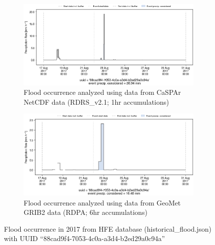 \documentclass[10pt,a4paper,titlepage,parskip]{scrartcl}
\begin{document}
\begin{figure}[h]
	\begin{subfigure}[a]{1.0\textwidth}
		\centering
		\includegraphics[width=\linewidth]{figures/compare_Geomet_CaSPAr/interpolated_at_stations_occurrence_1008_identified-timesteps_RDRS_v2.1.png}
		\caption{Flood occurrence analyzed using data from CaSPAr NetCDF data (RDRS\_v2.1; 1hr accumulations)}
	\end{subfigure}
	\par\bigskip\bigskip
	\begin{subfigure}[b]{1.0\textwidth}
		\centering
		\includegraphics[width=\linewidth]{figures/compare_Geomet_CaSPAr/interpolated_at_stations_occurrence_1008_identified-timesteps_rdpa:10km:6f.png}
		\caption{Flood occurrence analyzed using data from GeoMet GRIB2 data (RDPA; 6hr accumulations)}
	\end{subfigure}
	\par\bigskip\bigskip
	\caption{Flood occurrence in 2017 from HFE database (historical\_flood.json) with UUID ``88cad9f4-7053-4c0a-a3d4-b2ed29a0c94a''}
\end{figure}
\pagebreak
\end{document}
